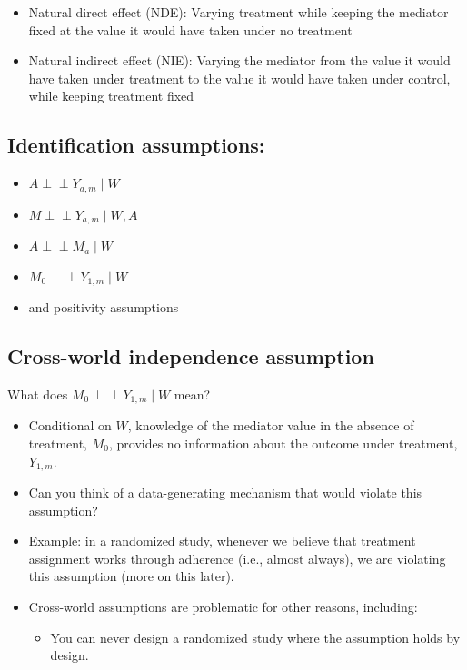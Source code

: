 \documentclass[
  12pt,
]{book}
\providecommand{\tightlist}{%
  \setlength{\itemsep}{0pt}\setlength{\parskip}{0pt}}
\theoremstyle{definition}
\theoremstyle{definition}
\theoremstyle{definition}
\newcommand{\indep}{\mbox{$\perp\!\!\!\perp$}}
\newcommand{\1}{\mathbbm{1}}
\begin{document}
\begin{itemize}
\tightlist
\item
  Natural direct effect (NDE): Varying treatment while keeping the mediator
  fixed at the value it would have taken under no treatment
\item
  Natural indirect effect (NIE): Varying the mediator from the value it would
  have taken under treatment to the value it would have taken under control,
  while keeping treatment fixed
\end{itemize}

\hypertarget{identification-assumptions-1}{%
\subsection{Identification assumptions:}\label{identification-assumptions-1}}

\begin{itemize}
\tightlist
\item
  \(A \indep Y_{a,m} \mid W\)
\item
  \(M \indep Y_{a,m} \mid W, A\)
\item
  \(A \indep M_a \mid W\)
\item
  \(M_0 \indep Y_{1,m} \mid W\)
\item
  and positivity assumptions
\end{itemize}

\hypertarget{cross-world-independence-assumption}{%
\subsection{Cross-world independence assumption}\label{cross-world-independence-assumption}}

What does \(M_0 \indep Y_{1,m} \mid W\) mean?

\begin{itemize}
\tightlist
\item
  Conditional on \(W\), knowledge of the mediator value in the absence of
  treatment, \(M_0\),
  provides no information about the outcome under treatment, \(Y_{1,m}\).
\item
  Can you think of a data-generating mechanism that would violate this
  assumption?
\item
  Example: in a randomized study, whenever we believe that treatment assignment
  works through adherence (i.e., almost
  always), we are violating this assumption (more on this later).
\item
  Cross-world assumptions are problematic for other reasons, including:

  \begin{itemize}
  \tightlist
  \item
    You can never design a randomized study where the assumption holds by
    design.
  \end{itemize}
\end{itemize}
\end{document}
